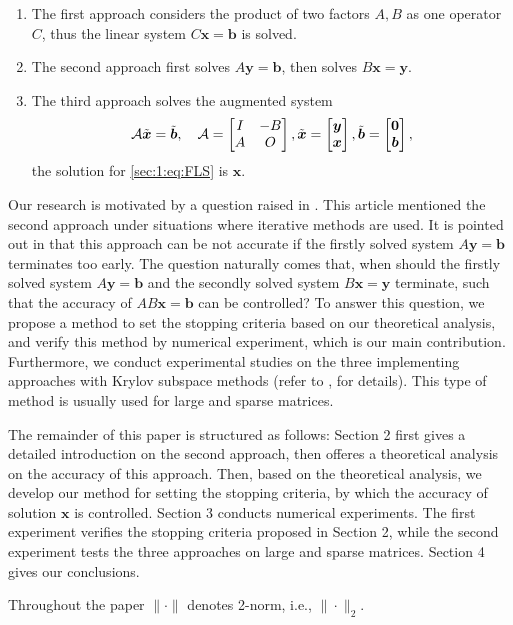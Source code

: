 \par
\begin{enumerate}
    \item The first approach considers the product of two factors $ A , B$ as one operator $ C $, thus the linear system $C\boldsymbol{x}=\boldsymbol{b}$ is solved.
    \item  The second approach first solves $A\boldsymbol{y}=\boldsymbol{b}$, then solves $B\boldsymbol{x}=\boldsymbol{y}$.
    \item  The third approach solves the augmented system
\begin{equation*}%
    \mathcal{A}\Tilde{\boldsymbol{x}}=\Tilde{\boldsymbol{b}},\quad
\mathcal{A} = \begin{bmatrix}
    I & -B\\
    A & O
\end{bmatrix},
\Tilde{\boldsymbol{x}} =\begin{bmatrix}
    \boldsymbol{y}\\
    \boldsymbol{x}
\end{bmatrix},
\Tilde{\boldsymbol{b}}=\begin{bmatrix}
    \boldsymbol{0}\\
    \boldsymbol{b}
\end{bmatrix},
\end{equation*}
the solution for \eqref{sec:1:eq:FLS} is $\boldsymbol{x}$.
\end{enumerate}
\par
Our research is motivated by a question raised in \cite{DU24}. This article mentioned the second approach under situations where iterative methods are used. It is pointed out in \cite[p.1]{DU24} that this approach can be not accurate if the firstly solved system $A\boldsymbol{y}=\boldsymbol{b}$ terminates too early. The question naturally comes that, when should the firstly solved system $A\boldsymbol{y}=\boldsymbol{b}$ and the secondly solved system
$B\boldsymbol{x}=\boldsymbol{y}$ terminate, such that the accuracy of $AB\boldsymbol{x}=\boldsymbol{b}$ can be controlled? To answer this question, we propose a method to set the stopping criteria based on our theoretical analysis, and verify this method by numerical experiment, which is our main contribution.
Furthermore, we conduct experimental studies on the three implementing approaches with Krylov subspace methods (refer to \cite{SO23}, \cite{ME20} for details). This type of method is usually used for large and sparse matrices.
\par
The remainder of this paper is structured as follows: Section 2 first gives a detailed introduction on the second approach, then offeres a theoretical analysis on the accuracy of this approach. Then, based on the theoretical analysis, we develop our method for setting the stopping criteria, by which the accuracy of solution $\boldsymbol{x}$ is controlled. Section 3 conducts numerical experiments. The first experiment verifies the stopping criteria proposed in Section 2, while the
second experiment tests the three approaches on large and sparse matrices. Section 4 gives our conclusions.
\par
Throughout the paper $\|\cdot \|$ denotes  2-norm, i.e.,  $\|\cdot \|_2$. 

